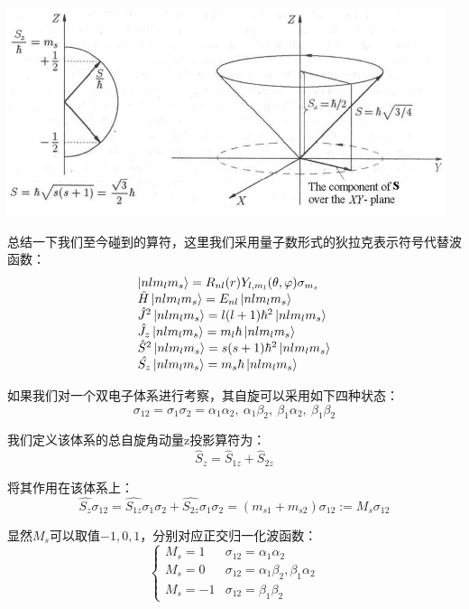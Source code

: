 \begin{center}
    \includegraphics[scale=0.7]{fig/lzhx/微信图片_20211028113518}
\end{center}

总结一下我们至今碰到的算符，这里我们采用量子数形式的狄拉克表示符号代替波函数：
\[
    \begin{array}{ll}
        \ket{nlm_lm_s}=R_{nl}(r)Y_{l,m_l}(\theta,\varphi)\sigma_{m_s} \\
        \hat{H}\ket{nlm_lm_s}=E_{nl}\ket{nlm_lm_s} \\
        \hat{J}^2\ket{nlm_lm_s}=l(l+1)\hbar^2\ket{nlm_lm_s} \\
        \hat{J_z}\ket{nlm_lm_s}=m_l\hbar\ket{nlm_lm_s} \\
        \hat{S}^2\ket{nlm_lm_s}=s(s+1)\hbar^2\ket{nlm_lm_s} \\
        \hat{S_z}\ket{nlm_lm_s}=m_s\hbar\ket{nlm_lm_s}
    \end{array}
\]

如果我们对一个双电子体系进行考察，其自旋可以采用如下四种状态：
\[\sigma_{12}=\sigma_{1}\sigma_{2}=\alpha_1\alpha_2, \ \alpha_1\beta_2, \ \beta_1\alpha_2, \ \beta_1\beta_2\]

我们定义该体系的总自旋角动量z投影算符为：
\[\hat{S}_z=\hat{S}_{1z}+\hat{S}_{2z}\]

将其作用在该体系上：
\[\hat{S_z}\sigma_{12}=\hat{S_{1z}}\sigma_{1}\sigma_{2}+\hat{S_{2z}}\sigma_{1}\sigma_{2}=(m_{s1}+m_{s2})\sigma_{12}:=M_s\sigma_{12}\]

显然$M_s$可以取值$-1,0,1$，分别对应正交归一化波函数：
\[
    \left \{
    \begin{array}{ll}
        M_s=1  & \sigma_{12}=\alpha_1\alpha_2\\
        M_s=0  & \sigma_{12}=\alpha_1\beta_2,\beta_1\alpha_2\\
        M_s=-1 & \sigma_{12}=\beta_1\beta_2
    \end{array}
    \right .
\]

